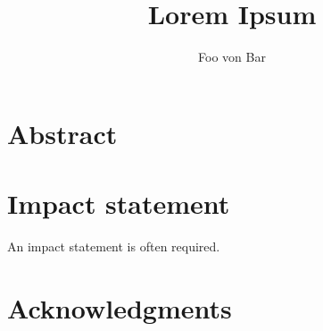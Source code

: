 \documentclass[british,a4paper,11pt,twoside]{ThesisStyle}
\title{Lorem Ipsum}\let\thetitle\@title
\author{Foo von Bar}\let\theauthor\@author
\begin{document}
\frontmatter


%

\dominitoc

\copyrightpage{\the\year}{\theauthor}
\declarationpage{\theauthor}

\cleardoublepage
\chapter{Abstract}


\cleardoublepage
\chapter{Impact statement}
An impact statement is often required.

\cleardoublepage
\chapter{Acknowledgments}


\cleardoublepage
\tableofcontents

\clearpage
{}
\mtcaddchapter[\listtablename]
\listoftables

\clearpage
{}
\mtcaddchapter[\listfigurename]
\listoffigures

\mainmatter







\backmatter

\printbibliography[heading=bibintoc]
\end{document}
